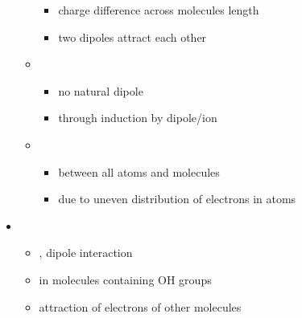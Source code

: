 \documentclass{article}
\theoremstyle{sltheorem}
\begin{document}
\begin{itemize}
\begin{itemize}
\begin{itemize}
            \item charge difference across molecules length
            \item two dipoles attract each other
        \end{itemize}
        \item {}
        \begin{itemize}
            \item no natural dipole
            \item through induction by dipole/ion
        \end{itemize}
        \item {}
        \begin{itemize}
            \item between all atoms and molecules
            \item due to uneven distribution of electrons in atoms
        \end{itemize}
    \end{itemize}
    \item {}
    \begin{itemize}
        \item {}, dipole interaction
        \item in molecules containing OH groups
        \item attraction of electrons of other molecules
    \end{itemize}
\end{itemize}
\end{document}
